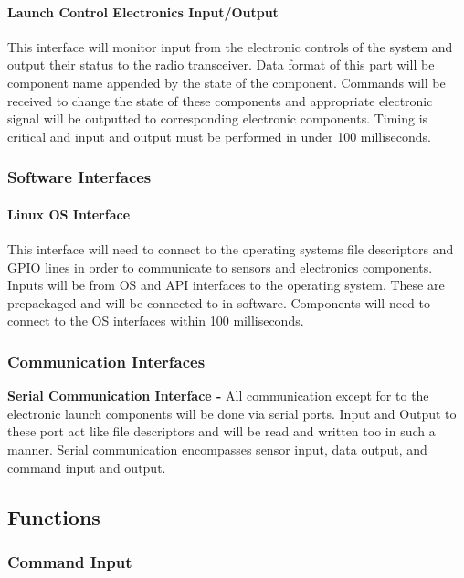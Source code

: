 \documentclass[10pt,draftclsnofoot,onecolumn,compsoc]{IEEEtran}
\begin{document}
\paragraph{\bf Launch Control Electronics Input/Output}
This interface will monitor input from the electronic controls of the system and output their status to the radio transceiver. Data format of this part will be component name appended by the state of the component. Commands will be received to change the state of these components and appropriate electronic signal will be outputted to corresponding electronic components. Timing is critical and input and output must be performed in under 100 milliseconds.


\subsubsection{Software Interfaces}
\paragraph{\bf Linux OS Interface} This interface will need to connect to the operating systems file descriptors and GPIO lines in order to communicate to sensors and electronics components. Inputs will be from OS and API interfaces to the operating system. These are prepackaged and will be connected to in software. Components will need to connect to the OS interfaces within 100 milliseconds. 

\subsubsection{Communication Interfaces}
{\bf Serial Communication Interface -} All communication except for to the electronic launch components will be done via serial ports. Input and Output to these port act like file descriptors and will be read and written too in such a manner. Serial communication encompasses sensor input, data output, and command input and output.

\subsection{Functions}
\subsubsection{Command Input}
\end{document}
